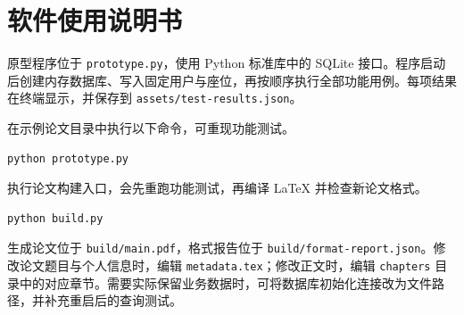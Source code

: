 \chapter{软件使用说明书}
\label{app:usage}
原型程序位于 \texttt{prototype.py}，使用 Python 标准库中的 SQLite 接口。程序启动后创建内存数据库、写入固定用户与座位，再按顺序执行全部功能用例。每项结果在终端显示，并保存到 \texttt{assets/test-results.json}。

在示例论文目录中执行以下命令，可重现功能测试。
\begin{lstlisting}[language=bash]
python prototype.py
\end{lstlisting}

执行论文构建入口，会先重跑功能测试，再编译 LaTeX 并检查新论文格式。
\begin{lstlisting}[language=bash]
python build.py
\end{lstlisting}

生成论文位于 \texttt{build/main.pdf}，格式报告位于 \texttt{build/format-report.json}。修改论文题目与个人信息时，编辑 \texttt{metadata.tex}；修改正文时，编辑 \texttt{chapters} 目录中的对应章节。需要实际保留业务数据时，可将数据库初始化连接改为文件路径，并补充重启后的查询测试。
